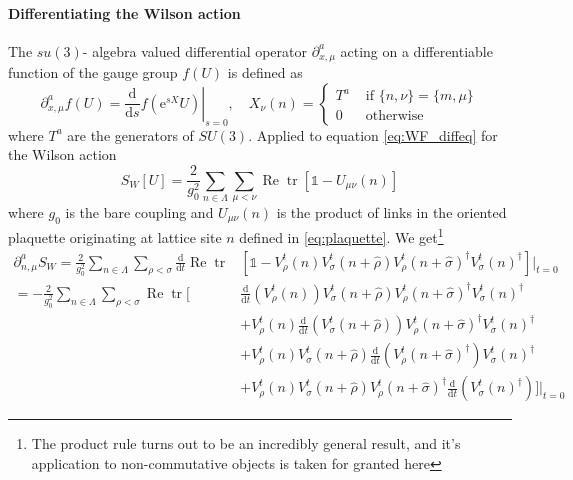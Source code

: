 \documentclass[a4paper,10pt]{article}
\begin{document}
\paragraph{Differentiating the Wilson action}
The $su(3)$- algebra valued differential operator $\partial^a_{x,\mu}$ acting on a differentiable function of the gauge group $f(U)$ is defined as
\begin{equation}\label{eq:diffOponGaugeGroup}
\partial_{x, \mu}^{a} f(U)=\left.\frac{\mathrm{d}}{\mathrm{d} s} f\left(\mathrm{e}^{s X} U\right)\right|_{s=0}, \quad X_\nu(n)= \begin{cases}T^{a} & \text { if }\{n, \nu\}=\{m, \mu\} \\ 0 & \text { otherwise }\end{cases}
\end{equation}
where $T^a$ are the generators of $SU(3)$. Applied to equation \eqref{eq:WF_diffeq} for the Wilson action
\begin{equation}
S_{W}[U]=\frac{2}{g_0^{2}} \sum_{n \in \Lambda} \sum_{\mu<\nu} \operatorname{Re} \operatorname{tr}\left[\mathbb{1}-U_{\mu \nu}(n)\right]
\end{equation}
where $g_0$ is the bare coupling and $U_{\mu \nu}(n)$ is the product of links in the oriented plaquette originating at lattice site $n$ defined in \eqref{eq:plaquette}.
We get\footnote{The product rule turns out to be an incredibly general result, and it's application to non-commutative objects is taken for granted here}
\begin{equation}
\begin{aligned} 
\partial_{n, \mu}^{a}S_W = \frac{2}{g_0^{2}} \sum_{n \in \Lambda} \sum_{\rho<\sigma} \frac{\mathrm{d}}{\mathrm{d} t}\operatorname{Re} \operatorname{tr}&\left[\mathbb{1}-V^t_{\rho}(n) V^t_{\sigma}(n+\hat{\rho}) V^t_{\rho}(n+\hat{\sigma})^{\dagger} V^t_{\sigma}(n)^{\dagger}\right]\Big|_{t=0}\\
= -\frac{2}{g_0^{2}} \sum_{n \in \Lambda} \sum_{\rho<\sigma} \operatorname{Re} \operatorname{tr}\Bigg[&\frac{\mathrm{d}}{\mathrm{d} t}\left( V^t_{\rho}(n) \right) V^t_{\sigma}(n+\hat{\rho}) V^t_{\rho}(n+\hat{\sigma})^{\dagger} V^t_{\sigma}(n)^{\dagger}\\ &+V^t_{\rho}(n)\frac{\mathrm{d}}{\mathrm{d} t} \left( V^t_{\sigma}(n+\hat{\rho}) \right) V^t_{\rho}(n+\hat{\sigma})^{\dagger} V^t_{\sigma}(n)^{\dagger}\\&+V^t_{\rho}(n) V^t_{\sigma}(n+\hat{\rho}) \frac{\mathrm{d}}{\mathrm{d} t}\left( V^t_{\rho}(n+\hat{\sigma})^{\dagger} \right) V^t_{\sigma}(n)^{\dagger}\\&+ V^t_{\rho}(n) V^t_{\sigma}(n+\hat{\rho}) V^t_{\rho}(n+\hat{\sigma})^{\dagger} \frac{\mathrm{d}}{\mathrm{d} t}\left( V^t_{\sigma}(n)^{\dagger} \right)\Bigg]\Bigg|_{t=0}
\end{aligned}
\end{equation}
\end{document}
